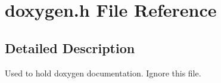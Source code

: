\section{doxygen.h File Reference}
\label{doxygen_8h}


\subsection{Detailed Description}
Used to hold doxygen documentation. Ignore this file. 



